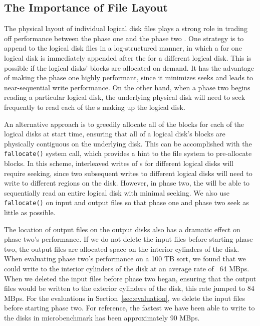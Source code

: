 \subsection{The Importance of File Layout}

The physical layout of individual logical disk files plays a strong role in
trading off performance between the phase one \writer and the phase two
\reader.  One strategy is to append to the logical disk files in a
log-structured manner, in which a \writerbuffer for one logical disk is
immediately appended after the \writerbuffer for a different logical disk.
This is possible if the logical disks' blocks are allocated on demand.  It has
the advantage of making the phase one \writer highly performant, since it
minimizes seeks and leads to near-sequential write performance.  On the other
hand, when a phase two \reader begins reading a particular logical disk, the
underlying physical disk will need to seek frequently to read each of the
\writerbuffer{}s making up the logical disk.

An alternative approach is to greedily allocate all of the blocks for each of
the logical disks at start time, ensuring that all of a logical disk's blocks
are physically contiguous on the underlying disk.  This can be accomplished
with the \texttt{fallocate()} system call, which provides a hint to the file
system to pre-allocate blocks.  In this scheme, interleaved writes of
\writerbuffer{}s for different logical disks will require seeking, since two
subsequent writes to different logical disks will need to write to different
regions on the disk.  However, in phase two, the \reader will be able to
sequentially read an entire logical disk with minimal seeking. We also use
\texttt{fallocate()} on input and output files so that phase one \readers and
phase two \writers seek as little as possible.

The location of output files on the output disks also has a dramatic effect on
phase two's performance.  If we do not delete the input files before starting
phase two, the output files are allocated space on the interior cylinders of
the disk.  When evaluating phase two's performance on a 100 TB sort, we found
that we could write to the interior cylinders of the disk at an average rate of
~64 MBps.  When we deleted the input files before phase two began, ensuring that
the output files would be written to the exterior cylinders of the disk, this
rate jumped to 84 MBps.  For the evaluations in Section~\ref{sec:evaluation}, we
delete the input files before starting phase two.  For reference, the fastest
we have been able to write to the disks in microbenchmark
has been approximately 90 MBps.

